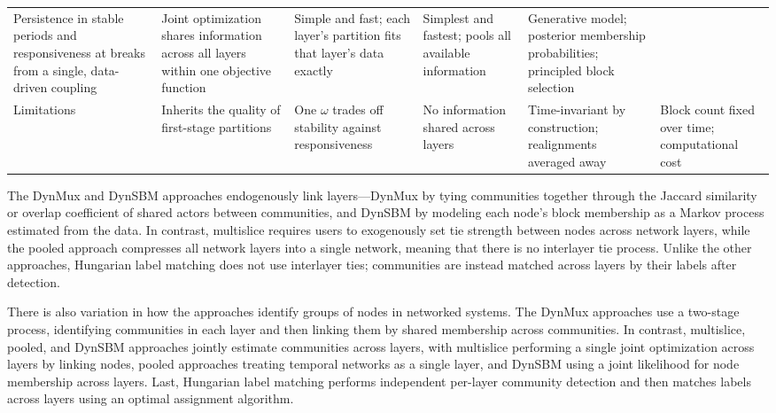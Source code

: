 \documentclass[11pt, letterpaper]{article}
\begin{document}
\begin{table}[t]
\begin{tabular}{@{}L{1.9cm}L{2.5cm}L{2.4cm}L{2.4cm}L{2.4cm}L{2.4cm}@{}}
Persistence in stable periods and responsiveness at breaks from a single,
data-driven coupling &
Joint optimization shares information across all layers within one
objective function &
Simple and fast; each layer's partition fits that layer's data exactly &
Simplest and fastest; pools all available information &
Generative model; posterior membership probabilities; principled block
selection \\
\addlinespace
Limitations &
Inherits the quality of first-stage partitions &
One $\omega$ trades off stability against responsiveness &
No information shared across layers &
Time-invariant by construction; realignments averaged away &
Block count fixed over time; computational cost\\
\bottomrule
\end{tabular}
\end{table}

The DynMux and DynSBM approaches endogenously link layers---DynMux by tying communities together through the Jaccard similarity or overlap coefficient of shared actors between communities, and DynSBM by modeling each node's block membership as a Markov process estimated from the data. In contrast, multislice requires users to exogenously set tie strength between nodes across network layers, while the pooled approach compresses all network layers into a single network, meaning that there is no interlayer tie process. Unlike the other approaches, Hungarian label matching does not use interlayer ties; communities are instead matched across layers by their labels after detection.

There is also variation in how the approaches identify groups of nodes in networked systems. The DynMux approaches use a two-stage process, identifying communities in each layer and then linking them by shared membership across communities. In contrast, multislice, pooled, and DynSBM approaches jointly estimate communities across layers, with multislice performing a single joint optimization across layers by linking nodes, pooled approaches treating temporal networks as a single layer, and DynSBM using a joint likelihood for node membership across layers. Last, Hungarian label matching performs independent per-layer community detection and then matches labels across layers using an optimal assignment algorithm.
\end{document}
